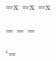 \newcount\n@px  \n@px\@ne
\newcount\n@pxi \n@pxi\@ne
\newcount\n@pxii\n@pxii\@ne

\newskip\s@xx
\newskip\s@xxi
\newskip\s@xxii
\newskip\s@Yx
\newskip\s@Yxi
\newskip\s@Yxii
\newskip\s@ax
\newskip\s@axi
\newskip\s@axii
\newtoks\s@sx  \s@sx={x}
\newtoks\s@sxi \s@sxi={x}
\newtoks\s@sxii\s@sxii={x}
\newcount\s@yx
\newcount\s@yxi
\newcount\s@yxii
\newcount\s@Nx
\newcount\s@Nxi
\newcount\s@Nxii
\newcount\s@zx  \s@zx\maxdimen
\newcount\s@zxi \s@zxi\maxdimen
\newcount\s@zxii\s@zxii\maxdimen
\newtoks\s@dx
\newtoks\s@dxi
\newtoks\s@dxii

\newcount\a@sx  \newcount\o@sx
\newcount\a@sxi \newcount\o@sxi
\newcount\a@sxii\newcount\o@sxii

\newtoks\a@cx   \a@cx={{\z@}{\z@}{\z@}{\z@}}
\newtoks\a@cxi  \a@cxi={{\z@}{\z@}{\z@}{\z@}}
\newtoks\a@cxii \a@cxii={{\z@}{\z@}{\z@}{\z@}}

\newtoks\o@cx
\newtoks\o@cxi
\newtoks\o@cxii

\newtoks\m@tx
\newtoks\m@txi
\newtoks\m@txii

\def\resetlayout{\let\interfacteur\nin@
  \stafftopmarg\thr@@\Interligne \staffbotmarg\thr@@\Interligne
  \let\n@li\fiv@ \let\n@lii\fiv@ \let\n@liii\fiv@
  \let\n@liv\fiv@ \let\n@lv\fiv@ \let\n@lvi\fiv@
  \let\n@lvii\fiv@ \let\n@lviii\fiv@ \let\n@lix\fiv@
  \let\n@lx\fiv@ \let\n@lxi\fiv@ \let\n@lxii\fiv@
  \resetclefsymbols}

\def\resetclefsymbols{%
  \let\treblec@si\z@ \let\treblec@sii\z@ \let\treblec@siii\z@ \let\treblec@siv\z@
  \let\treblec@sv\z@ \let\treblec@svi\z@ \let\treblec@svii\z@ \let\treblec@sviii\z@ \let\treblec@six\z@
  \let\treblec@sx\z@ \let\treblec@sxi\z@ \let\treblec@sxii\z@
  \let\altoc@si\z@ \let\altoc@sii\z@ \let\altoc@siii\z@ \let\altoc@siv\z@
  \let\altoc@sv\z@ \let\altoc@svi\z@ \let\altoc@svii\z@ \let\altoc@sviii\z@ \let\altoc@six\z@
  \let\altoc@sx\z@ \let\altoc@sxi\z@ \let\altoc@sxii\z@
  \let\bassc@si\z@ \let\bassc@sii\z@ \let\bassc@siii\z@ \let\bassc@siv\z@
  \let\bassc@sv\z@ \let\bassc@svi\z@ \let\bassc@svii\z@ \let\bassc@sviii\z@ \let\bassc@six\z@
  \let\bassc@sx\z@ \let\bassc@sxi\z@ \let\bassc@sxii\z@
}

\let\nbinstruments\maxinstruments
\normalnotesize\resetlayout
\let\nbinstruments\@ne

\let\wlog\@wloG

\catcode`\@=\catcodeat
\endinput
